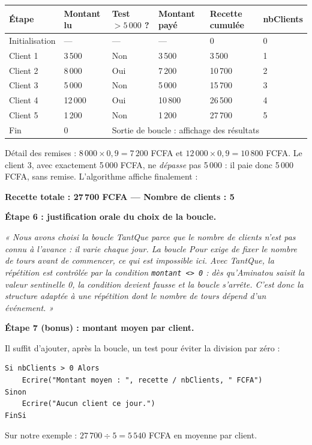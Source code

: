 \documentclass[11pt]{article}
\begin{document}
\begin{exoresolu}
\begin{center}
\begin{tabularx}{\linewidth}{|l|X|X|X|X|X|}
\hline
\rowcolor{popblueL} \textbf{Étape} & \textbf{Montant lu} & \textbf{Test $> 5\,000$ ?} & \textbf{Montant payé} & \textbf{Recette cumulée} & \textbf{nbClients} \\
\hline
Initialisation & --- & --- & --- & 0 & 0 \\
\hline
Client 1 & 3\,500 & Non & 3\,500 & 3\,500 & 1 \\
\hline
Client 2 & 8\,000 & Oui & 7\,200 & 10\,700 & 2 \\
\hline
Client 3 & 5\,000 & Non & 5\,000 & 15\,700 & 3 \\
\hline
Client 4 & 12\,000 & Oui & 10\,800 & 26\,500 & 4 \\
\hline
Client 5 & 1\,200 & Non & 1\,200 & 27\,700 & 5 \\
\hline
Fin & 0 & \multicolumn{4}{l|}{Sortie de boucle : affichage des résultats} \\
\hline
\end{tabularx}
\end{center}

Détail des remises : $8\,000 \times 0{,}9 = 7\,200$ FCFA et $12\,000 \times 0{,}9 = 10\,800$ FCFA. Le client 3, avec exactement 5\,000 FCFA, ne \emph{dépasse} pas 5\,000 : il paie donc 5\,000 FCFA, sans remise. L'algorithme affiche finalement :
\begin{center}
\textbf{Recette totale : 27\,700 FCFA \quad --- \quad Nombre de clients : 5}
\end{center}

\textbf{Étape 6 : justification orale du choix de la boucle.}

\emph{« Nous avons choisi la boucle TantQue parce que le nombre de clients n'est pas connu à l'avance : il varie chaque jour. La boucle Pour exige de fixer le nombre de tours avant de commencer, ce qui est impossible ici. Avec TantQue, la répétition est contrôlée par la condition \texttt{montant <> 0} : dès qu'Aminatou saisit la valeur sentinelle 0, la condition devient fausse et la boucle s'arrête. C'est donc la structure adaptée à une répétition dont le nombre de tours dépend d'un événement. »}

\textbf{Étape 7 (bonus) : montant moyen par client.}

Il suffit d'ajouter, après la boucle, un test pour éviter la division par zéro :
\begin{lstlisting}
Si nbClients > 0 Alors
    Ecrire("Montant moyen : ", recette / nbClients, " FCFA")
Sinon
    Ecrire("Aucun client ce jour.")
FinSi
\end{lstlisting}
Sur notre exemple : $27\,700 \div 5 = 5\,540$ FCFA en moyenne par client.
\end{exoresolu}
\end{document}
